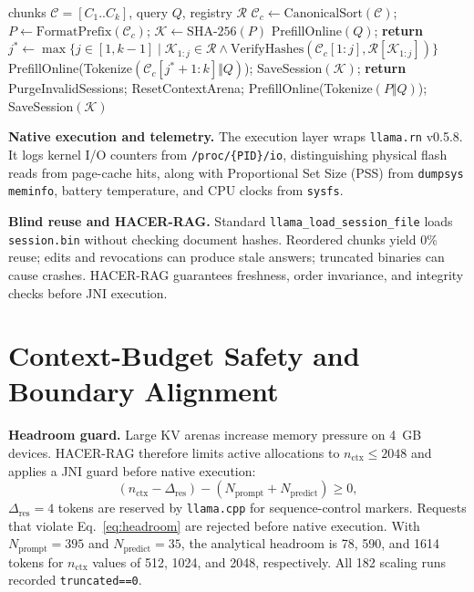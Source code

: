 \documentclass[10pt,conference]{IEEEtran}
\newcommand{\systemname}{HACER-RAG}
\newcommand{\us}{\_\allowbreak}
\begin{document}
\begin{algorithm}[!t]
\caption{HACER hierarchical cache validation and repair}
\label{alg:hacer_repair}
\scriptsize
\begin{algorithmic}[1]
\REQUIRE chunks $\mathcal{C}=[C_1..C_k]$, query $Q$, registry $\mathcal{R}$
\STATE $\mathcal{C}_c\gets\text{CanonicalSort}(\mathcal{C})$; $P\gets\text{FormatPrefix}(\mathcal{C}_c)$; $\mathcal{K}\gets\text{SHA-256}(P)$
  \STATE {} PrefillOnline$(Q)$; \textbf{return}
\ENDIF
\STATE $j^{*}\gets\max\{j\in[1,k{-}1] \mid \mathcal{K}_{1:j}\in\mathcal{R} \land \text{VerifyHashes}(\mathcal{C}_c[1{:}j],\mathcal{R}[\mathcal{K}_{1:j}])\}$
  \STATE {} PrefillOnline(Tokenize$(\mathcal{C}_c[j^{*}{+}1{:}k]\Vert Q)$); SaveSession$(\mathcal{K})$; \textbf{return}
\ENDIF
\STATE {} PurgeInvalidSessions; ResetContextArena; PrefillOnline(Tokenize$(P\Vert Q)$); SaveSession$(\mathcal{K})$
\end{algorithmic}
\end{algorithm}

\textbf{Native execution and telemetry.} The execution layer wraps \texttt{llama.rn} v0.5.8. It logs kernel I/O counters from \texttt{/proc/\allowbreak\{PID\}/\allowbreak io}, distinguishing physical flash reads from page-cache hits, along with Proportional Set Size (PSS) from \texttt{dumpsys meminfo}, battery temperature, and CPU clocks from \texttt{sysfs}.

\textbf{Blind reuse and HACER-RAG.} Standard \texttt{llama\us load\us session\us file} loads \texttt{session.bin} without checking document hashes. Reordered chunks yield 0\% reuse; edits and revocations can produce stale answers; truncated binaries can cause crashes. \systemname{} guarantees freshness, order invariance, and integrity checks before JNI execution.

\section{Context-Budget Safety and Boundary Alignment}
\label{sec:context_safety}
\textbf{Headroom guard.} Large KV arenas increase memory pressure on 4~GB devices. \systemname{} therefore limits active allocations to $n_{\text{ctx}}\le2048$ and applies a JNI guard before native execution:
\begin{equation}
(n_{\text{ctx}}-\Delta_{\text{res}})-(N_{\text{prompt}}+N_{\text{predict}})\ge 0,
\label{eq:headroom}
\end{equation}
$\Delta_{\text{res}}=4$ tokens are reserved by \texttt{llama.cpp} for sequence-control markers. Requests that violate Eq.~\eqref{eq:headroom} are rejected before native execution. With $N_{\text{prompt}}=395$ and $N_{\text{predict}}=35$, the analytical headroom is 78, 590, and 1614 tokens for $n_{\text{ctx}}$ values of 512, 1024, and 2048, respectively. All 182 scaling runs recorded \texttt{truncated==0}.
\end{document}
